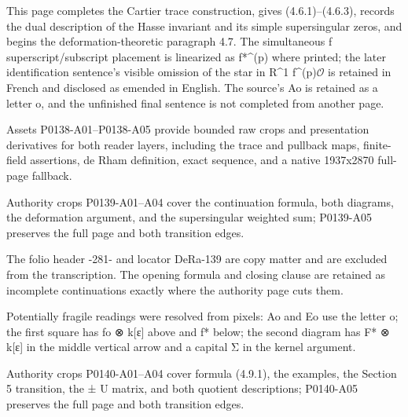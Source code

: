 \documentclass[11pt,a4paper]{article}
\begin{document}
This page completes the Cartier trace construction, gives (4.6.1)--(4.6.3), records the dual description of the Hasse invariant and its simple supersingular zeros, and begins the deformation-theoretic paragraph 4.7. The simultaneous f superscript/subscript placement is linearized as f\textunderscore{}*\textasciicircum{}(p) where printed; the later identification sentence's visible omission of the star in R\textasciicircum{}1 f\textasciicircum{}(p)\ensuremath{\mathcal{O}} is retained in French and disclosed as emended in English. The source's A\textunderscore{}o is retained as a letter o, and the unfinished final sentence is not completed from another page.

Assets P0138-A01--P0138-A05 provide bounded raw crops and presentation derivatives for both reader layers, including the trace and pullback maps, finite-field assertions, de Rham definition, exact sequence, and a native 1937x2870 full-page fallback.


\par\medskip
\hypertarget{D018-P0139}{}
\par\smallskip
Authority crops P0139-A01--A04 cover the continuation formula, both diagrams, the deformation argument, and the supersingular weighted sum; P0139-A05 preserves the full page and both transition edges.

The folio header -281- and locator DeRa-139 are copy matter and are excluded from the transcription. The opening formula and closing clause are retained as incomplete continuations exactly where the authority page cuts them.

Potentially fragile readings were resolved from pixels: A\textunderscore{}o and E\textunderscore{}o use the letter o; the first square has f\textunderscore{}o ⊗ k[ε] above and f* below; the second diagram has F* ⊗ k[ε] in the middle vertical arrow and a capital Σ in the kernel argument.


\par\medskip
\hypertarget{D018-P0140}{}
\par\smallskip
Authority crops P0140-A01--A04 cover formula (4.9.1), the examples, the Section 5 transition, the ± U matrix, and both quotient descriptions; P0140-A05 preserves the full page and both transition edges.
\end{document}

